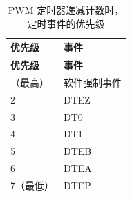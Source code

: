 \begin{longtable}[c]{|p{6cm}|p{6cm}|}
    \caption{PWM 定时器递减计数时，定时事件的优先级}
    \label{tab:mcpwm-evt-prio-d}
    \\\hline
    \rowcolor{lightgray}
    \textbf{优先级}
    & \textbf{事件}
    \\\hline
    \endfirsthead
    \hline
    \rowcolor{lightgray}   
    \textbf{优先级}
    & \textbf{事件}
    \\\hline
    \endhead
    \hline
    \endfoot
    1（最高）
    & 软件强制事件
    \\\hline
    2
    & DTEZ
    \\\hline
    3
    & DT0
    \\\hline
    4
    & DT1
    \\\hline
    5
    & DTEB
    \\\hline
    6
    & DTEA
    \\\hline
    7（最低）
    & DTEP
    \end{longtable}